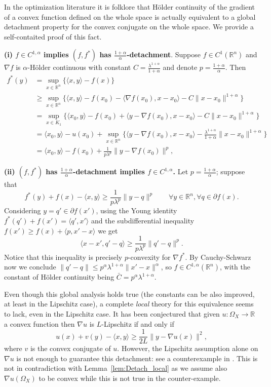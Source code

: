 \documentclass[reqno,12pt]{article}
\newcommand{\R}{\mathbb{R}}
\begin{document}
\begin{oss} In the optimization literature it is folklore that H\"older continuity of the gradient of a convex function defined on the whole space is actually equivalent to a global detachment property for the convex conjugate on the whole space. We provide a self-contaited proof of this fact.

\textbf{(i) $f \in C^{1,\alpha}$ implies $(f,f^*)$ has $ \frac {1+\alpha}{\alpha}$-detachment}. Suppose $f \in C^1(\R^n)$ and $\nabla f$ is $\alpha$-H\"{o}lder continuous with constant $C= \frac{ \lambda^{1+\alpha}}{1+\alpha}$ and denote $p = \frac{ 1+\alpha}{\alpha}$. Then
\begin{align*}
    f^*(y) &= \sup_{x \in \R^n} \{ \langle x,y\rangle - f(x)  \}  \\
    & \geqslant \sup_{x \in \R^n} \{ \langle x,y\rangle - f(x_0) - \langle \nabla f(x_0) , x-x_0 \rangle - C \| x-x_0\|^{1+\alpha}  \} \\
    & = \sup_{x \in K_1} \{ \langle x_0,y\rangle -f(x_0)  + \langle y-\nabla f(x_0) , x-x_0 \rangle - C \| x-x_0\|^{1+\alpha}  \} \\
    & = \langle x_0,y\rangle - u(x_0) +\sup_{x \in \R^n} \{ \langle y-\nabla f (x_0) , x-x_0 \rangle - \frac{\lambda^{1+\alpha}}{1+\alpha} \| x-x_0\|^{1+\alpha}  \} \\
     & = \langle x_0,y\rangle - f(x_0) + \frac{ 1}{p\lambda^{p}}\| y- \nabla f (x_0)\|^p,
\end{align*}

\textbf{(ii) $(f,f^*)$ has $\frac{1+\alpha}{\alpha}$-detachment implies $f \in C^{1,\alpha}$.} Let $p=\frac{1+\alpha}{\alpha}$; suppose that
$$ f^*(y)+f(x) - \langle x,y\rangle  \geqslant \frac 1{p \lambda^p} \| y-q\|^p \qquad  \forall y \in \R^n, \forall q \in \partial f (x).$$
Considering $y=q' \in \partial f (x')$, using the Young identity $f^*(q')+f(x')= \langle q',x'\rangle$ and the subdifferential inequality $f(x') \geqslant f(x) + \langle p, x'-x\rangle$ we get
$$  \langle x-x', q'-q \rangle  \geqslant \frac 1{p \lambda^p} \| q'-q\|^p.$$
Notice that this inequality is precisely $p$-convexity for $\nabla f^*$. By Cauchy-Schwarz now we conclude $\|q'-q\| \leqslant p^{\alpha}\lambda^{1+\alpha} \|x'-x\|^{\alpha}$, so $f \in C^{1, \alpha}(\R^n)$, with the constant of H\"{o}lder continuity being $\bar{C}= p^{\alpha} \lambda^{1+\alpha}$.

Even though this global analysis holds true (the constants can be also improved, at least in the Lipschitz case), a complete \emph{local} theory for this equivalence seems to lack, even in the Lipschitz case. It has been conjectured that given $u : \Omega_X \to \mathbb{R}$ a convex function then $\nabla u$ is $L$-Lipschitz if and only if 
$$u(x)+v(y)-\langle x,y \rangle \geqslant \frac 1{2L} \| y- \nabla u(x)\|^2,$$
where $v$ is the convex conjugate of $u$. However, the Lipschitz assumption alone on $\nabla u$ is not enough to guarantee this detachment: see a counterexample in \cite{Drori20}. This is not in contradiction with Lemma~\ref{lem:Detach_local} as we assume also $\nabla u ( \Omega_X)$ to be convex while this is not true in the counter-example.


\end{oss}
\end{document}

